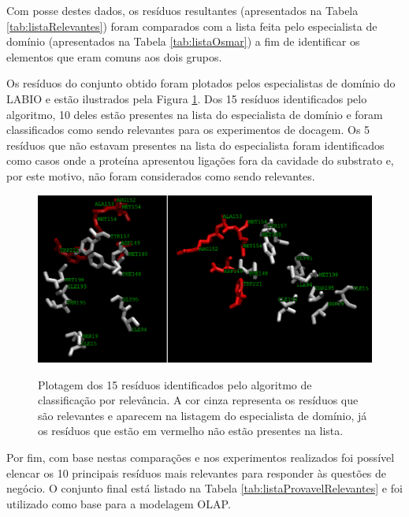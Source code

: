 Com posse destes dados, os resíduos resultantes (apresentados na Tabela \ref{tab:listaRelevantes}) foram comparados com a lista feita pelo especialista de domínio (apresentados na Tabela \ref{tab:listaOsmar}) a fim de identificar os elementos que eram comuns aos dois grupos. 

Os resíduos do conjunto obtido foram plotados pelos especialistas de domínio do LABIO e estão ilustrados pela Figura \ref{fig:PlotResiduos}. Dos 15 resíduos identificados pelo algoritmo, 10 deles estão presentes na lista do especialista de domínio e foram classificados como sendo relevantes para os experimentos de docagem. Os 5 resíduos que não estavam presentes na lista do especialista foram identificados como casos onde a proteína apresentou ligações fora da cavidade do substrato e, por este motivo, não foram considerados como sendo relevantes.

\begin{figure}[h]
        \center
        \includegraphics[scale=0.55]{images/avaliacao_Residuos_nomes.png}
        \label{fig:PlotResiduos}
        \caption{Plotagem dos 15 resíduos identificados pelo algoritmo de classificação por relevância. A cor cinza representa os resíduos que são relevantes e aparecem na listagem do especialista de domínio, já os resíduos que estão em vermelho não estão presentes na lista.}
\end{figure}

Por fim, com base nestas comparações e nos experimentos realizados foi possível elencar os 10 principais resíduos mais relevantes para responder às questões de negócio. O conjunto final está listado na Tabela \ref{tab:listaProvavelRelevantes} e foi utilizado como base para a modelagem OLAP.

